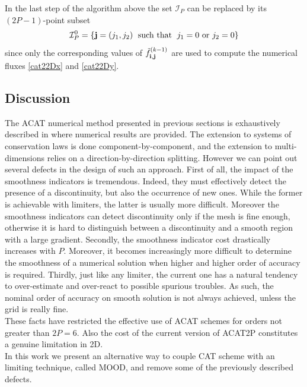 \begin{rem}
 In the last step of the algorithm above the set $\mathcal{I}_P$ can be replaced by its $(2P -1)$-point subset
 $$
 \mathcal{I}^0_P = \{ \mathbf{j} = (j_1, j_2)\; \text{ \rm{such that} } \;j_1 = 0 \text{ or } j_2 = 0 \}
 $$
 since only the corresponding values of $\tilde{f}^{(k-1)}_{\mathbf{i},\mathbf{j}}$ are  used to compute the numerical fluxes \eqref{cat22Dx} and
 \eqref{cat22Dy}.
 \end{rem}


\subsection{Discussion} \label{ssec:beyondCAT_discusssion}
The ACAT numerical method presented in previous sections is exhaustively described in \cite{CPZMR2020,Macca-Pares} where numerical results are provided.
The extension to systems of conservation laws is done component-by-component, and the extension to multi-dimensions relies on a direction-by-direction splitting.
However we can point out several defects in the design of such an approach.
First of all, the impact of the \apriori smoothness indicators is tremendous. Indeed, they must effectively detect the presence of a discontinuity, but also the occurrence of new ones. While the former is achievable with \apriori limiters, the latter is usually more difficult.
Moreover the smoothness indicators can detect discontinuity only if the mesh is fine enough, otherwise it is hard to distinguish between a discontinuity and a smooth region with a large gradient.
Secondly, the smoothness indicator cost drastically increases with $P$. Moreover, it becomes increasingly more difficult to determine the smoothness of a numerical solution when higher and higher order of accuracy is required.
Thirdly, just like any \apriori limiter, the current one has a natural tendency to over-estimate and over-react to possible spurious troubles. As such, the nominal order of accuracy on smooth solution is not always achieved, unless the grid is really fine. \\
These facts have restricted the effective use of ACAT schemes for orders not greater than $2P=6$. 
Also the cost of the current version of ACAT2P constitutes a genuine limitation in 2D. \\
In this work we present an alternative way to couple CAT scheme with an \aposteriori limiting technique, called MOOD, and remove
some of the previously described defects.

